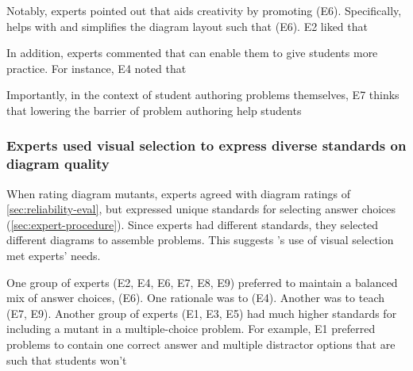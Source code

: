 Notably, experts pointed out that \Edgeworth aids creativity by promoting  (E6). Specifically, \Edgeworth helps with  and simplifies the diagram layout such that  (E6). E2 liked that  

In addition, experts commented that \Edgeworth can enable them to give students more practice. For instance, E4 noted that   

Importantly, in the context of student authoring problems themselves, E7 thinks that lowering the barrier of problem authoring help students 

\subsubsection{Experts used visual selection to express diverse standards on diagram quality}
\label{sec:edgeworth-expert-standards}

When rating diagram mutants, experts agreed with diagram ratings of \cref{sec:reliability-eval}, but expressed unique standards for selecting answer choices (\cref{sec:expert-procedure}). Since experts had different standards, they selected different diagrams to assemble problems. This suggests \Edgeworth's use of visual selection met experts' needs.

One group of experts (E2, E4, E6, E7, E8, E9) preferred to maintain a balanced mix of answer choices,  (E6). One rationale was to  (E4). Another was to teach  (E7, E9). Another group of experts (E1, E3, E5) had much higher standards for including a mutant in a multiple-choice problem. For example, E1 preferred problems to contain one correct answer and multiple distractor options that are  such that students won't 

